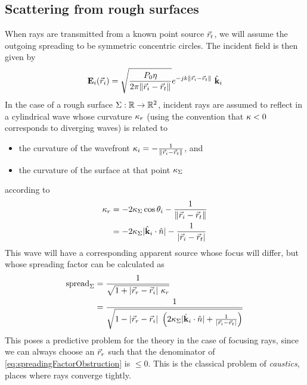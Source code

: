 \documentclass{article}
\DeclarePairedDelimiter\norm{\lVert}{\rVert}
\begin{document}
\subsection{Scattering from rough surfaces}
When rays are transmitted from a known point source $\vec{r}_t$, we will assume the outgoing
spreading to be symmetric concentric circles. The incident field is then given by 
\begin{equation}
   \incField (\incPt) = \sqrt{\frac{P_0 \impedance}{2 \pi \norm{\incPt - \tx}}} e^{- \im k
   \norm{\incPt - \tx}} \ \wavevecNorm_i
   \label{eq:incidentGOField}
\end{equation}
In the case of a rough surface $\Sigma:
\mathbb{R} \to \mathbb{R}^2$, incident rays are assumed to reflect in a cylindrical wave
whose curvature $\kappa_r$ (using the convention that $\kappa < 0$ corresponds to
diverging waves) is related to 
\begin{itemize}
   \item the curvature of the wavefront $\curv_i = -\frac{1}{\norm{\incPt - \tx}}$,
      and 
   \item the curvature of the surface at that point $\kappa_{\Sigma}$
\end{itemize}
according to 
\begin{align}
   \curv_r &= - 2 \curv_{\surf} \cos \theta_i - \frac{1}{\norm{\incPt - \tx}} \nonumber \\
   &= - 2 \curv_{\surf} | \wavevecNorm_i \cdot \normVNorm | - \frac{1}{|\incPt - \tx|}
   \label{eq:outgoingCurvature}
\end{align}
This wave will have a corresponding apparent source whose focus will differ, but
whose spreading factor can be calculated as 
\begin{align}
   \text{spread}_{\surf} &= \frac{1}{\sqrt{1 + |\reflPt - \incPt| \ \curv_r }}
      \nonumber \\
   &= \frac{1}{\sqrt{1 - |\reflPt - \incPt| \ \left( 2
      \curv_{\surf} | \wavevecNorm_i \cdot \normVNorm | + \frac{1}{|\incPt -
      \tx|}\right) }}
      \label{eq:spreadingFactorObstruction}   
\end{align}
This poses a predictive problem for the theory in the case of focusing rays, since we
can always choose an $\vec{r}_r$ such that the denominator of
\eqref{eq:spreadingFactorObstruction} is $\leq 0$. This is the classical problem of
\emph{caustics}, places where rays converge tightly.
\end{document}
